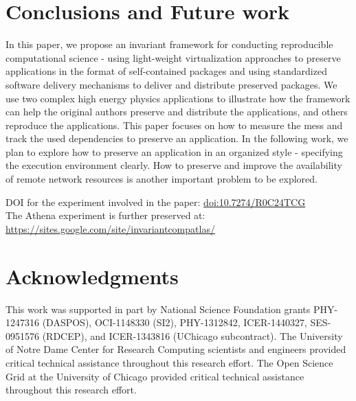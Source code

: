 \documentclass[procedia]{easychair}
\begin{document}
\section{Conclusions and Future work}
In this paper, we propose an invariant framework for conducting reproducible computational science - using light-weight virtualization approaches to preserve applications in the format of self-contained packages and using standardized software delivery mechanisms to deliver and distribute preserved packages.
We use two complex high energy physics applications to illustrate how the framework can help the original authors preserve and distribute the applications, and others reproduce the applications.
This paper focuses on how to measure the mess and track the used dependencies to preserve an application.
In the following work, we plan to explore how to preserve an application in an organized style - specifying the execution environment clearly.
How to preserve and improve the availability of remote network resources is another important problem to be explored.

\small
DOI for the experiment involved in the paper: \url{doi:10.7274/R0C24TCG}\\
The Athena experiment is further preserved at: \url{https://sites.google.com/site/invariantcompatlas/} 
\vspace{-20pt}
\section*{Acknowledgments}

This work was supported in part by National Science Foundation grants PHY-1247316 (DASPOS), 
OCI-1148330 (SI2), PHY-1312842, ICER-1440327, SES-0951576 (RDCEP), and ICER-1343816 (UChicago subcontract).
The University of Notre Dame Center for Research Computing scientists and engineers provided critical technical assistance throughout this research effort.
The Open Science Grid at the University of Chicago provided critical technical assistance throughout this research effort.

\vspace{-10pt}


\end{document}
